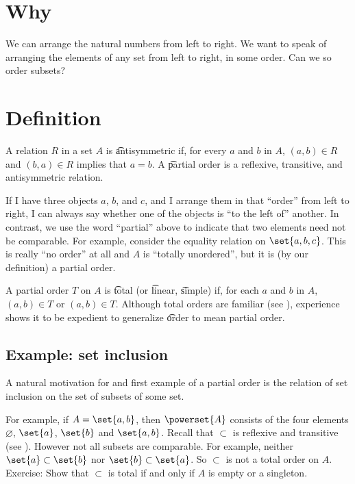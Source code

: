 

\section*{Why}

We can arrange the natural numbers from left to right.
We want to speak of arranging the elements of any set from left to right, in some order.
Can we so order subsets?

\section*{Definition}

A relation $R$ in a set $A$ is \t{antisymmetric} if, for every $a$ and $b$ in $A$, $(a, b) \in R$ and $(b, a) \in R$ implies that $a = b$.
A \t{partial order} is a reflexive, transitive, and antisymmetric relation.

If I have three objects $a$, $b$, and $c$, and I arrange them in that ``order'' from left to right, I can always say whether one of the objects is ``to the left of'' another.
In contrast, we use the word ``partial'' above to indicate that two elements need not be comparable.
For example, consider the equality relation on $\set{a, b, c}$.
This is really ``no order'' at all and $A$ is ``totally unordered'', but it is (by our definition) a partial order.

A partial order $T$ on $A$ is \t{total} (or \t{linear}, \t{simple}) if, for each $a$ and $b$ in $A$, $(a, b) \in T$ or $(a, b) \in T$.
Although total orders are familiar (see ), experience shows it to be expedient to generalize \t{order} to mean partial order.

\subsection*{Example: set inclusion}

A natural motivation for and first example of a partial order is the relation of set inclusion on the set of subsets of some set.

For example, if $A = \set{a, b}$, then $\powerset{A}$ consists of the four elements $\varnothing$, $\set{a}$, $\set{b}$ and $\set{a,b}$.
Recall that $\subset$ is reflexive and transitive (see ).
However not all subsets are comparable.
For example, neither $\set{a} \subset \set{b}$ nor $\set{b} \subset \set{a}$.
So $\subset$ is not a total order on $A$.
Exercise: Show that $\subset$ is total if and only if $A$ is empty or a singleton.

